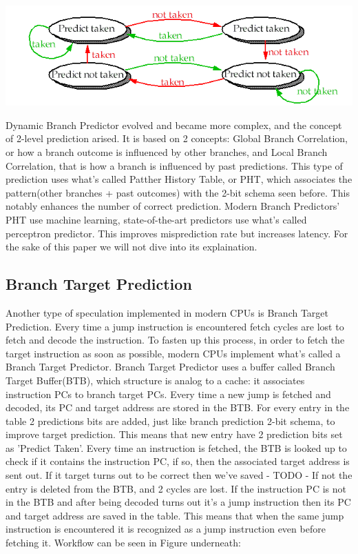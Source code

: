 \includegraphics[scale=0.35]{img/2bitBHT.png}

Dynamic Branch Predictor evolved and became more complex, and the concept of 2-level prediction arised. It is based on 2 concepts: Global Branch Correlation, or how a branch outcome is influenced by other branches, and Local Branch Correlation, that is how a branch is influenced by past predictions. This type of prediction uses what's called Patther History Table, or PHT, which associates the pattern(other branches + past outcomes) with the 2-bit schema seen before. This notably enhances the number of correct prediction.
Modern Branch Predictors' PHT use machine learning, state-of-the-art predictors use what's called perceptron predictor. This improves misprediction rate but increases latency. For the sake of this paper we will not dive into its explaination.

\subsection{Branch Target Prediction}
Another type of speculation implemented in modern CPUs is Branch Target Prediction.
Every time a jump instruction is encountered fetch cycles are lost to fetch and decode the instruction.
To fasten up this process, in order to fetch the target instruction as soon as possible, modern CPUs implement what's called a Branch Target Predictor.
Branch Target Predictor uses a buffer called Branch Target Buffer(BTB), which structure is analog to a cache: it associates instruction PCs to branch target PCs. Every time a new jump is fetched and decoded, its PC and target address are stored in the BTB.
For every entry in the table 2 predictions bits are added, just like branch prediction 2-bit schema, to improve target prediction.
This means that new entry have 2 prediction bits set as 'Predict Taken'.
Every time an instruction is fetched, the BTB is looked up to check if it contains the instruction PC, if so, then the associated target address is sent out.
If it target turns out to be correct then we've saved - TODO -
If not the entry is deleted from the BTB, and 2 cycles are lost.
If the instruction PC is not in the BTB and after being decoded turns out it's a jump instruction then its PC and target address are saved in the table.
This means that when the same jump instruction is encountered it is recognized as a jump instruction even before fetching it.
Workflow can be seen in Figure underneath:

